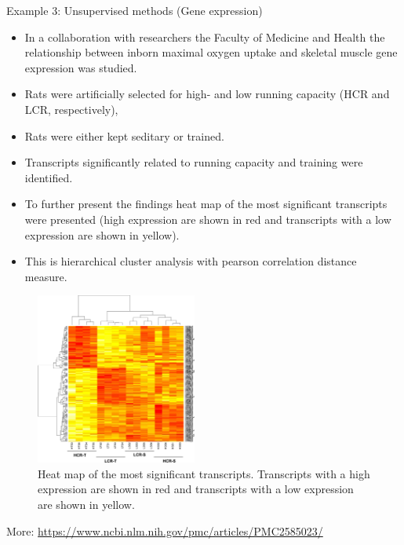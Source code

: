 \documentclass[10pt,ignorenonframetext,]{beamer}
\providecommand{\tightlist}{%
  \setlength{\itemsep}{0pt}\setlength{\parskip}{0pt}}
\begin{document}
\begin{frame}{Example 3: Unsupervised methods (Gene expression)}

\begin{itemize}
\tightlist
\item
  In a collaboration with researchers the Faculty of Medicine and Health
  the relationship between inborn maximal oxygen uptake and skeletal
  muscle gene expression was studied.
\item
  Rats were artificially selected for high- and low running capacity
  (HCR and LCR, respectively),
\item
  Rats were either kept seditary or trained.
\item
  Transcripts significantly related to running capacity and training
  were identified. 
\item
  To further present the findings heat map of the most significant
  transcripts were presented (high expression are shown in red and
  transcripts with a low expression are shown in yellow).
\item
  This is hierarchical cluster analysis with pearson correlation
  distance measure.
\end{itemize}

\end{frame}

\begin{frame}

\begin{figure}
\includegraphics[width=150pt]{heatmap} \caption{Heat map of the most significant transcripts. Transcripts with a high expression are shown in red and transcripts with a low expression are shown in yellow.}\label{fig:heatmap_pic}
\end{figure}

\tiny
More: \url{https://www.ncbi.nlm.nih.gov/pmc/articles/PMC2585023/}

\end{frame}
\end{document}
